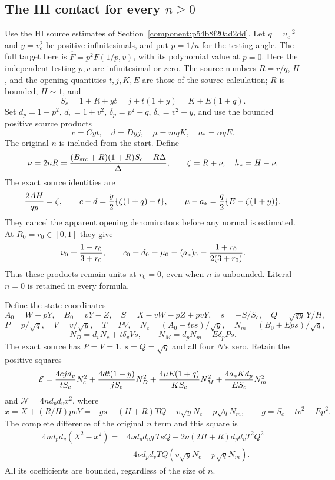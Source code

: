 \subsection{The HI contact for every $n\ge0$}
\label{component:p888d9f79ba3b}
\label{component:p4363feef60dd}
\label{p888d9f79ba3b:sec:r7-hi-n0-retained}
\label{p4363feef60dd:sec:r7-hi-full-retained}
Use the HI source estimates of Section~\ref{component:p54b8f20ad2dd}.
Let $q=u_c^{-2}$ and $y=v_c^2$ be positive infinitesimals, and put
$p=1/u$ for the testing angle. The full target here is
$\widehat F=p^2F(1/p,v)$, with its polynomial value at $p=0$.
Here the independent testing $p,v$ are infinitesimal or zero.
The source numbers $R=r/q$, $H$, and the opening quantities $t,j,K,E$
are those of the source calculation; $R$ is bounded, $H\sim1$, and
\[
 S_c=1+R+yt=j+t(1+y)=K+E(1+q).
\]
Set $d_p=1+p^2$, $d_v=1+v^2$, $\delta_p=p^2-q$,
$\delta_v=v^2-y$, and use the bounded positive source products
\[
 c=Cyt,\quad d=Dyj,\quad \mu=mqK,\quad a_*=\alpha qE.
\]
The original $n$ is included from the start. Define
\[
 \nu=2nR={(B_{\rm src}+R)(1+R)S_c-R\Delta\over\Delta},
 \qquad \zeta=R+\nu,\quad h_*=H-\nu.
\]
The exact source identities are
\[
 {2AH\over qy}=\zeta,\qquad
 c-d={y\over2}\{\zeta(1+q)-t\},\qquad
 \mu-a_*={q\over2}\{E-\zeta(1+y)\}.
\]
They cancel the apparent opening denominators before any normal is
estimated. At $R_0=r_0\in[0,1]$ they give
\[
 \nu_0={1-r_0\over3+r_0},\qquad
 c_0=d_0=\mu_0=(a_*)_0={1+r_0\over2(3+r_0)}.
\]
Thus these products remain units at $r_0=0$, even when $n$ is
unbounded. Literal $n=0$ is retained in every formula.

Define the state coordinates
\[
 A_0=W-pY,\quad B_0=vY-Z,\quad
 S=X-vW-pZ+pvY,\quad s=-S/S_c,\quad Q=\sqrt{qy}\,Y/H,
\]
\[
 P=p/\sqrt q,\quad V=v/\sqrt y,\quad T=PV,
 \quad N_c=(A_0-tv s)/\sqrt y,\quad
 N_m=(B_0+Ep s)/\sqrt q,
\]
\[
 N_D=d_vN_c+t\delta_vVs,\qquad
 N_M=d_pN_m-E\delta_pPs.
\]
The exact source has $P=V=1$, $s=Q=\sqrt q$ and all four $N$'s zero.
Retain the positive squares
\[
 \mathcal E={4cj d_v\over tS_c}N_c^2
 +{4dt(1+y)\over jS_c}N_D^2
 +{4\mu E(1+q)\over KS_c}N_M^2
 +{4a_*K d_p\over ES_c}N_m^2
\]
and $\mathcal N=4nd_pd_vx^2$, where
\[
 x=X+(R/H)pvY=-g s+(H+R)TQ+v\sqrt yN_c-p\sqrt qN_m,
 \qquad g=S_c-tv^2-Ep^2.
\]
The complete difference of the original $n$ term and this square is
\[
 \begin{split}
 4nd_pd_v(X^2-x^2)={}&4\nu d_pd_vg\,TsQ
 -2\nu(2H+R)d_pd_vT^2Q^2\\
 &-4\nu d_pd_vTQ(v\sqrt yN_c-p\sqrt qN_m).
 \end{split}
\]
All its coefficients are bounded, regardless of the size of $n$.

